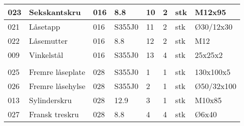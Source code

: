 \begin{tabular}{|l|l|l|l|l|l|l|l|}
023 & Sekskantskru & 016 & 8.8 & 10 & 2 & stk & M12x95\\ \hline
021 & Låsetapp & 016 & S355J0 & 11 & 2 & stk & Ø30/12x30\\ \hline
022 & Låsemutter & 016 & 8.8 & 12 & 2 & stk & M12\\ \hline
009 & Vinkelstål & 016 & S355J0 & 13 & 4 & stk & 25x25x2\\ \hline
 &  &  &  &  &  &  & \\ \hline
025 & Fremre låseplate & 028 & S355J0 & 1 & 1 & stk & 130x100x5\\ \hline
026 & Fremre låsehylse & 028 & S355J0 & 2 & 1 & stk & Ø50/32x100\\ \hline
013 & Sylinderskru & 028 & 12.9 & 3 & 1 & stk & M10x85\\ \hline
027 & Fransk treskru & 028 & 8.8 & 4 & 4 & stk & Ø6x40\\ \hline
\end{tabular}
